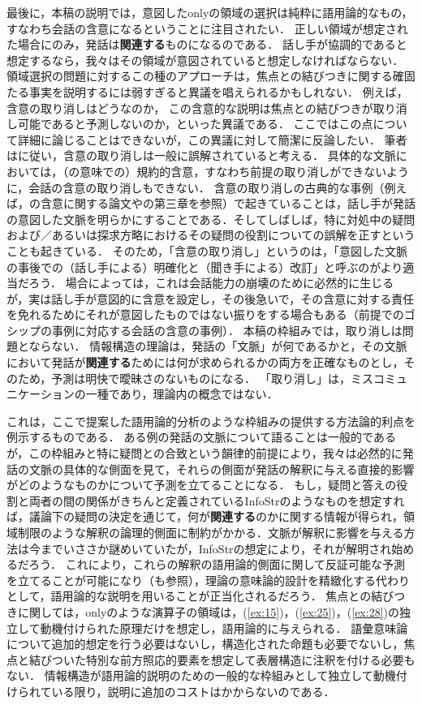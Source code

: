 \documentclass{goken}
\newcommand{\ori}[1]{\noindent\textcolor[gray]{0.7}{\fontsize{8pt}{8pt}\selectfont{\textsf{(p.~#1)}}} }
\begin{document}
最後に，本稿の説明では，意図したonlyの領域の選択は純粋に語用論的なもの，すなわち会話の含意になるということに注目されたい．
正しい領域が想定された場合にのみ，発話は\textbf{関連する}ものになるのである．
話し手が協調的であると想定するなら，我々はその領域が意図されていると想定しなければならない．
領域選択の問題に対するこの種のアプローチは，焦点との結びつきに関する確固たる事実を説明するには弱すぎると異議を唱えられるかもしれない．
例えば，含意の取り消しはどうなのか，
この含意的な説明は焦点との結びつきが取り消し可能であると予測しないのか，といった異議である．
ここではこの点について詳細に論じることはできないが，この異議に対して簡潔に反論したい．
筆者は\citet{Welker1994}に従い，含意の取り消しは一般に誤解されていると考える．
具体的な文脈においては，（\citealt{KarttunenPeters1979}の意味での）規約的含意，すなわち前提の取り消しができないように，会話の含意の取り消しもできない．
含意の取り消しの古典的な事例（例えば，\citealt{Grice1989}の含意に関する論文や\citealt{Levinson1983}の第三章を参照）で起きていることは，話し手が発話の意図した文脈を明らかにすることである．そしてしばしば，特に対処中の疑問および／あるいは探求方略におけるその疑問の役割についての誤解を正すということも起きている．
そのため，「含意の取り消し」というのは，「意図した文脈の事後での（話し手による）明確化と（聞き手による）改訂」と呼ぶのがより適当だろう．
\ori{46}
場合によっては，これは会話能力の崩壊のために必然的に生じるが，実は話し手が意図的に含意を設定し，その後急いで，その含意に対する責任を免れるためにそれが意図したものではない振りをする場合もある（前提でのゴシップの事例に対応する会話の含意の事例）．
本稿の枠組みでは，取り消しは問題とならない．
情報構造の理論は，発話の「文脈」が何であるかと，その文脈において発話が\textbf{関連する}ためには何が求められるかの両方を正確なものとし，そのため，予測は明快で曖昧さのないものになる．
「取り消し」は，ミスコミュニケーションの一種であり，理論内の概念ではない．

これは，ここで提案した語用論的分析のような枠組みの提供する方法論的利点を例示するものである．
ある例の発話の文脈について語ることは一般的であるが，この枠組みと特に疑問との合致という韻律的前提により，我々は必然的に発話の文脈の具体的な側面を見て，それらの側面が発話の解釈に与える直接的影響がどのようなものかについて予測を立てることになる．
もし，疑問と答えの役割と両者の間の関係がきちんと定義されているInfoStrのようなものを想定すれば，議論下の疑問の決定を通じて，何が\textbf{関連する}のかに関する情報が得られ，領域制限のような解釈の論理的側面に制約がかかる．文脈が解釈に影響を与える方法は今までいささか謎めいていたが，InfoStrの想定により，それが解明され始めるだろう．
これにより，これらの解釈の語用論的側面に関して反証可能な予測を立てることが可能になり（\citealt{KadmonRoberts1986}も参照），理論の意味論的設計を精緻化する代わりとして，語用論的な説明を用いることが正当化されるだろう．
焦点との結びつきに関しては，onlyのような演算子の領域は，(\ref{ex:15})，(\ref{ex:25})，(\ref{ex:28})の独立して動機付けられた原理だけを想定し，語用論的に与えられる．
語彙意味論について追加的想定を行う必要はないし，構造化された命題も必要でないし，焦点と結びついた特別な前方照応的要素を想定して表層構造に注釈を付ける必要もない．
情報構造が語用論的説明のための一般的な枠組みとして独立して動機付けられている限り，説明に追加のコストはかからないのである．
\end{document}
